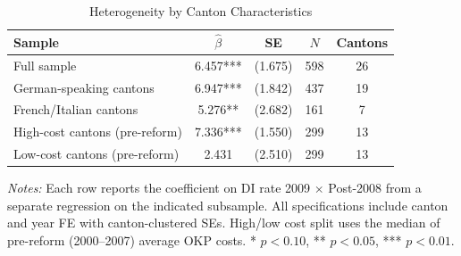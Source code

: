 \begin{table}[H]
\centering
\caption{Heterogeneity by Canton Characteristics}
\begin{threeparttable}
\begin{tabular}{lcccc}
\toprule
Sample & $\hat{\beta}$ & SE & $N$ & Cantons \\
\midrule
Full sample & 6.457*** & (1.675) & 598 & 26 \\
German-speaking cantons & 6.947*** & (1.842) & 437 & 19 \\
French/Italian cantons & 5.276** & (2.682) & 161 & 7 \\
High-cost cantons (pre-reform) & 7.336*** & (1.550) & 299 & 13 \\
Low-cost cantons (pre-reform) & 2.431 & (2.510) & 299 & 13 \\
\bottomrule
\end{tabular}
\begin{tablenotes}[flushleft]
\small
\item \textit{Notes:} Each row reports the coefficient on DI rate 2009 $\times$ Post-2008 from a separate regression on the indicated subsample. All specifications include canton and year FE with canton-clustered SEs. High/low cost split uses the median of pre-reform (2000--2007) average OKP costs. * $p<0.10$, ** $p<0.05$, *** $p<0.01$.
\end{tablenotes}
\end{threeparttable}
\label{tab:heterogeneity}
\end{table}
